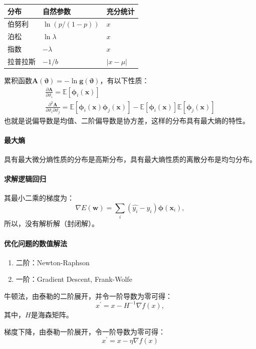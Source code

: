 \begin{table}[H]
\centering
\begin{tabular}{lll}
    \toprule
    分布 & 自然参数 & 充分统计 \\
    \midrule
    伯努利 & $\ln(p/(1-p))$ & $x$ \\
    泊松 & $\ln\lambda$ & $x$ \\
    指数 & $-\lambda$ & $x$ \\
    拉普拉斯 & $-1/b$ & $|x-\mu|$ \\
    \bottomrule
\end{tabular}
\end{table}
累积函数$\bm A(\bm\vartheta) = - \ln \bm g(\bm \vartheta)$，有以下性质：
$$
\begin{array}{l}
    \frac{\partial\bm A}{\partial \vartheta_i} = \mathbb{E}[\bm\phi_i(\bm x)] \\
    \frac{\partial^2\bm A}{\partial \vartheta_i\partial \vartheta_j} = \mathbb{E}[\bm\phi_i(\bm x)\bm\phi_j(\bm x)] - \mathbb{E}[\bm\phi_i(\bm x)]\mathbb{E}[\bm\phi_j(\bm x)]
\end{array}
$$
也就是说偏导数是均值、二阶偏导数是协方差，这样的分布具有最大熵的特性。

\paragraph{最大熵}
具有最大微分熵性质的分布是高斯分布，具有最大熵性质的离散分布是均匀分布。

\paragraph{求解逻辑回归} 其最小二乘的梯度为：
$$\nabla E(\bm w) = \sum_i (\hat{y_i} - y_i)\bm \phi(\bm x_i),$$
所以，没有解析解（封闭解）。

\paragraph{优化问题的数值解法} 
\begin{enumerate}
    \item 二阶：Newton-Raphson
    \item 一阶：Gradient Descent, Frank-Wolfe
\end{enumerate}

牛顿法，由泰勒的二阶展开，并令一阶导数为零可得：
$$x^{\prime} = x - H^{-1}\nabla f(x),$$
其中，$H$是海森矩阵。

梯度下降，由泰勒一阶展开，令一阶导数为零可得：
$$x^{\prime} = x -\eta\nabla{}f(x)$$

